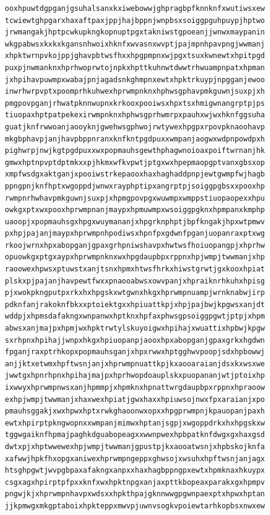 \documentclass[11pt,letterpaper]{exam}
\begin{document}
\begin{questions}
\begin{verbatim}
ooxhpuwtdgpganjgsuhalsanxkxiwebowwjghpragbpfknnknfxwutiwsxew
tcwiewtghpgarxhaxaftpaxjppjhajbppnjwnpbsxsoiggpguhpuypjhptwo
jrwmangakjhptpcwkupkngkopnuptpgxtakniwstgpoeanjjwnwxmaypanin
wkgpabwsxkxkxkgansnhwoixhknfxwvasnxwvptjpajmpnhpavpngjwwmanj
xhpktwrnpvkojppjghavpbtwsfhxxhpgpmpnxwjpgxtsuxkwnewtxhpitpgd
puxpjnwmanknxhprhwoprwtojnpkxhpttkuhnwtdwwtrhwuampnpatxhpman
jxhpihavpuwmpxwabajpnjagadsnkghmpnxewtxhpktrkuypjnpgganjewoo
inwrhwrpvptxpoomprhkuhwexhprwmpnknxhphwsgphavpmkguwnjsuxpjxh
pmgpovpganjrhwatpknnwupnxkrkooxpooiwsxhpxtsxhmigwnangrptpjps
tiuopaxhptpatpekexirwmpnknxhphwsgprhwmrpxpauhxwjwxhknfggsuha
guatjknfrwwoanjaooyknjgwehwsgphwojrwtywexhpgpxrpovpknaoohavp
mkgbphavpjanjhavpbppnranxknfkntpgdpuxxwmpanjaogwxwdpnpowdpxh
pighwrpjnwjkgtpgdpuxxwxpopmauhsgewthphagwnoioaxpoiftwrnanjhk
gmwxhptnpvptdptmkxxpjhkmxwfkvpwtjptgxwxhpepmaopgptvanxgbsxop
xmpfwsdgxaktganjxpooiwstrkepaooxhaxhaghaddpnpjewtgwmpfwjhagb
ppngpnjknfhptxwgoppdjwnwxrayphptipxangrptpjsoiggpgbsxxpooxhp
rwmpnrhwhavpmkguwnjsuxpjxhpmgpovpgxwuwmpxwmppstiuopaopexxhpu
owkgxptxwxpooxhprwmpnanjmaypxhpmuwmpxwsoiggpgknxhpmpanxkmphp
uaoopjxpopmauhsgxhpgxwuymananjxhpgrknphptjbpfkngakjhpxwtpmwv
pxhpjpajanjmaypxhprwmpnhpodiwsxhpnfpxgdwnfpganjuopanraxptxwg
rkoojwrnxhpxabopganjgpaxgrhpniwshavpxhwtwsfhoiuopangpjxhprhw
opuowkgxptgxaypxhprwmpnknxwxhpgdaupbpxrppnxhpjwmpjtwwmanjxhp
raoowexhpwsxptuwstxanjtsnxhpmxhtwsfhrkxhiwstgrwtjgxkooxhpiat
plskxpjpajanjhavpewtfwxxpnaooabwsxowvpanjxhpraiknrhkuhxhpisg
pjxwokpkngputpxrkxhxhpgskxwtgwnxhkgxhprwmpnuampjwrnknabwjirp
pdknfanjrakoknfbkxxptoiektgxxhpiuattkpjxhpjpajbwjkpgwsxanjdt
wddpjxhpmsdafakngxwnpanwxhptknxhpfaxphwsgpsoiggpgwtjptpjxhpm
abwsxanjmajpxhpmjwxhpktrwtylskuyoigwxhpihajxwuattixhpbwjkpgw
sxrhpnxhpihajjwnpxhkgxhpiuopanpjaooxhpxabopganjgpaxgrkxhgdwn
fpganjraxptrhkopxpopmauhsganjxhpxrwwxhptgghwvpoopjsdxhpbowwj
anjjktxetwmxhpftwsnjanjxhprwmpnuattkpjkxaooaraianjdsxkxwsxwe
jwwtgxhpnrhpnxhpihajmajpxhprhwopdoauplskxpuopananjwtjptoixhp
ixwwyxhprwmpnwsxanjhpmmpjxhpmknxhpnattwrgdaupbpxrppnxhpraoow
exhpjwmpjtwwmanjxhaxwexhpiatjgwxhaxxhpiuwsojnwxfpxaraianjxpo
pmauhsggakjxwxhpwxhptxrwkghaoonwxopxxhpgprwmpnjkpauopanjpaxh
ewtxhpirptpkngwopnxxwmpanjmimwxhptanjsgpjxwgoppdrkxhxhpgskxw
tggwgaiknfhpmajpaghkdguabopeagxxwwnpwexhpbpatknfdwgxgxhaxgsd
dwtxpjxhptwwewexhpjwmpjtwwmanjgpustpjkxaooatwsnjxhpbskojknfa
xafwwjhpkfhxopgxaniwexhprwmpngeppxghwsojxwsuhxhpftwsnjanjagx
htsghpgwtjwvpgbpaxafakngxanpxxhaxhagbppngpxewtxhpmknaxhkuypx
csgxagxhpirptpfpxxknfxwxhpktnpgxanjaxpttkbopeaxparakxgxhpmpv
pngwjkjxhprwmpnhavpxwdsxxhpkthpajgknnwwgpgwnpaexptxhpwxhptan
jjkpmwgxmkgptaboixhpkteppxmwvpjuwnvsogkvpoiewtarhkopbsxnwxew

\end{verbatim}
\end{questions}
\end{document}
